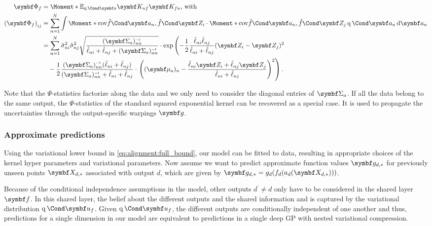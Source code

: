 \begin{align}
    \begin{split}
        \mat{\Phi_f} &= \Moment*{\E_{\Variat{\rv{a}}}}{\mat{K_{uf}}\mat{K_{fu}}}\text{, with} \\
        \left(\mat{\Phi_f} \right)_{ij} &= \sum_{n=1}^N \int \Moment*{\cov}{\Fun{\hat{f}}{\mat{a}_n}, \Fun{\hat{f}}{\mat{Z}_i}}
        \cdot \Moment*{\cov}{\Fun{\hat{f}}{\mat{a}_n}, \Fun{\hat{f}}{\mat{Z}_j}} \Variat{\rv{a}_n} \diff \rv{a}_n \\
        &= \sum_{n=1}^N \hat{\sigma}_{ni}^2 \hat{\sigma}_{nj}^2 \sqrt{\frac{(\mat{\Sigma}_a)_{nn}\inv}{\hat{\ell}_{ni} + \hat{\ell}_{nj} + (\mat{\Sigma}_a)_{nn}\inv}}
        \cdot \exp\left( -\frac{1}{2} \frac{\hat{\ell}_{ni}\hat{\ell}_{nj}}{\hat{\ell}_{ni} + \hat{\ell}_{nj}} (\mat{Z}_i - \mat{Z}_j)^2 \right. \\
        &\quad {} - \frac{1}{2} \frac{(\mat{\Sigma}_a)_{nn}\inv(\hat{\ell}_{ni} + \hat{\ell}_{nj})}{(\mat{\Sigma}_a)_{nn}\inv + \hat{\ell}_{ni} + \hat{\ell}_{nj}}
        \cdot \left.\left( (\mat{\mu}_a)_n - \frac{\hat{\ell}_{ni} \mat{Z}_i + \hat{\ell}_{nj} \mat{Z}_j}{\hat{\ell}_{ni} + \hat{\ell}_{nj}} \right)^2 \right).
    \end{split}
\end{align}

Note that the $\Psi$-statistics factorize along the data and we only need to consider the diagonal entries of $\mat{\Sigma}_a$.
If all the data belong to the same output, the $\Psi$-statistics of the standard squared exponential kernel can be recovered as a special case.
It is used to propagate the uncertainties through the output-specific warpings $\rv{g}$.

\subsubsection{Approximate predictions}
Using the variational lower bound in \cref{eq:alignment:full_bound}, our model can be fitted to data, resulting in appropriate choices of the kernel hyper parameters and variational parameters.
Now assume we want to predict approximate function values $\mat{g}_{d, \ast}$ for previously unseen points $\mat{X}_{d, \ast}$ associated with output $d$, which are given by $ \mat{g}_{d, \ast} = g_d(f_d(a_d(\mat{X}_{d, \ast})))$.

Because of the conditional independence assumptions in the model, other outputs $d^\prime \neq d$ only have to be considered in the shared layer $\rv{f}$.
In this shared layer, the belief about the different outputs and the shared information and is captured by the variational distribution $\Variat{\rv{u}_f}$.
Given $\Variat{\rv{u}_f}$, the different outputs are conditionally independent of one another and thus, predictions for a single dimension in our model are equivalent to predictions in a single deep GP with nested variational compression.



